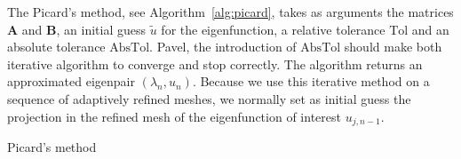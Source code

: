 \documentclass[preprint,12pt]{elsarticle}
\newtheorem{lemma}[theorem]{Lemma}
\begin{document}
The Picard's method, see Algorithm~\ref{alg:picard}, takes as arguments the matrices $\mathbf{A}$ and $\mathbf{B}$, an initial guess $\tilde u$ for the eigenfunction, a relative tolerance $\mathrm{Tol}$ and an absolute tolerance $\mathrm{AbsTol}$. {\red Pavel, the introduction of $\mathrm{AbsTol}$ should make both iterative algorithm to converge and stop correctly.} The algorithm returns an approximated eigenpair $(\lambda_{n},u_{n})$.
Because we use this iterative method on a sequence of adaptively refined meshes, we normally set as initial guess
the projection in the refined mesh of the eigenfunction of interest $u_{j,n-1}$.

\begin{algorithm}[H] \caption{Picard's method} \label{alg:picard} 
\begin{algorithmic}


\REPEAT

\end{algorithmic}
\end{algorithm}


\end{document}
